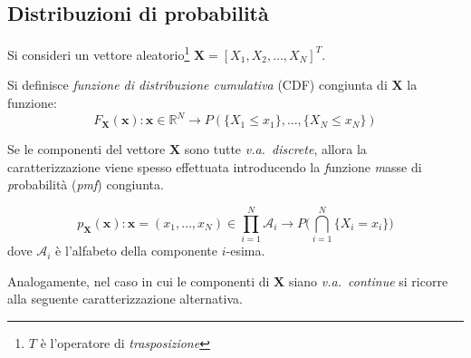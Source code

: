 \subsection{Distribuzioni di probabilità}

Si consideri un vettore aleatorio\footnote{$T$ è l'operatore di \emph{trasposizione}} $\mathbf{X}=[X_1,X_2,\dots,X_N]^T$.
\begin{Mybox}
    \begin{definizione}
        Si definisce \emph{funzione di distribuzione cumulativa} (CDF) congiunta di $\mathbf{X}$ la funzione:
        \begin{equation}
            F_{\mathbf{X}}(\mathbf{x})\colon\mathbf{x}\in\mathbb{R}^N \longrightarrow P(\{X_1\leq x_1\},\dots,\{X_N\leq x_N\})
        \end{equation} 
    \end{definizione}
\end{Mybox}

\smallskip
\noindent Se le componenti del vettore $\mathbf{X}$ sono tutte \emph{v.a.\ discrete}, allora la caratterizzazione 
viene spesso effettuata introducendo la
\emph{f}unzione \emph{m}asse di \emph{p}robabilità (\emph{pmf}) congiunta.

\smallskip
\begin{Mybox}
    \begin{definizione}
    \begin{equation}
        p_{\mathbf{X}}(\mathbf{x})\colon\mathbf{x}=(x_1,\dots,x_N)\in \prod_{i = 1}^{N}\mathcal{A}_i  \longrightarrow P\Biggl(\bigcap_{i=1}^{N}\{X_i=x_i\}\Biggr)
    \end{equation}
    dove $\mathcal{A}_i$ è l'alfabeto della componente $i$-esima.
    \end{definizione}  
\end{Mybox}

\noindent Analogamente, nel caso in cui le componenti di $\mathbf{X}$ siano \emph{v.a.\ continue} si ricorre alla seguente caratterizzazione alternativa.



